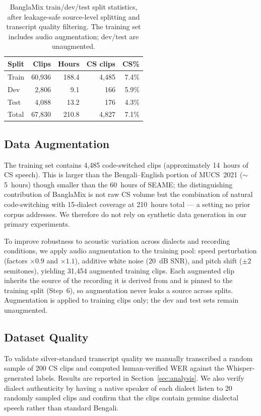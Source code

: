 \begin{table}[h]
\centering
\caption{BanglaMix train/dev/test split statistics, after leakage-safe
source-level splitting and transcript quality filtering. The training set
includes audio augmentation; dev/test are unaugmented.}
\label{tab:splits}
\small
\begin{tabular}{lrrrr}
\toprule
\textbf{Split} & \textbf{Clips} & \textbf{Hours} & \textbf{CS clips} & \textbf{CS\%} \\
\midrule
Train & 60{,}936 & 188.4 & 4{,}485 & 7.4\% \\
Dev   & 2{,}806  & 9.1   & 166     & 5.9\% \\
Test  & 4{,}088  & 13.2  & 176     & 4.3\% \\
\midrule
Total & 67{,}830 & 210.8 & 4{,}827 & 7.1\% \\
\bottomrule
\end{tabular}
\end{table}


\subsection{Data Augmentation}

The training set contains 4{,}485 code-switched clips (approximately 14~hours
of CS speech). This is larger than the Bengali--English portion of
MUCS~2021 ($\sim$5~hours) though smaller than the 60~hours of SEAME; the
distinguishing contribution of BanglaMix is not raw CS volume but the
combination of natural code-switching with 15-dialect coverage at 210~hours
total --- a setting no prior corpus addresses. We therefore do not rely on
synthetic data generation in our primary experiments.

To improve robustness to acoustic variation across dialects and recording
conditions, we apply audio augmentation to the training pool: speed
perturbation (factors $\times 0.9$ and $\times 1.1$), additive white noise
(20~dB SNR), and pitch shift ($\pm 2$ semitones), yielding 31{,}454 augmented
training clips. Each augmented clip inherits the source of the recording it is
derived from and is pinned to the training split (Step~6), so augmentation
never leaks a source across splits. Augmentation is applied to training clips
only; the dev and test sets remain unaugmented.

\subsection{Dataset Quality}

To validate silver-standard transcript quality we manually transcribed a
random sample of 200 CS clips and computed human-verified WER against the
Whisper-generated labels.
Results are reported in Section~\ref{sec:analysis}.
We also verify dialect authenticity by having a native speaker of each dialect
listen to 20 randomly sampled clips and confirm that the clips contain genuine
dialectal speech rather than standard Bengali.
